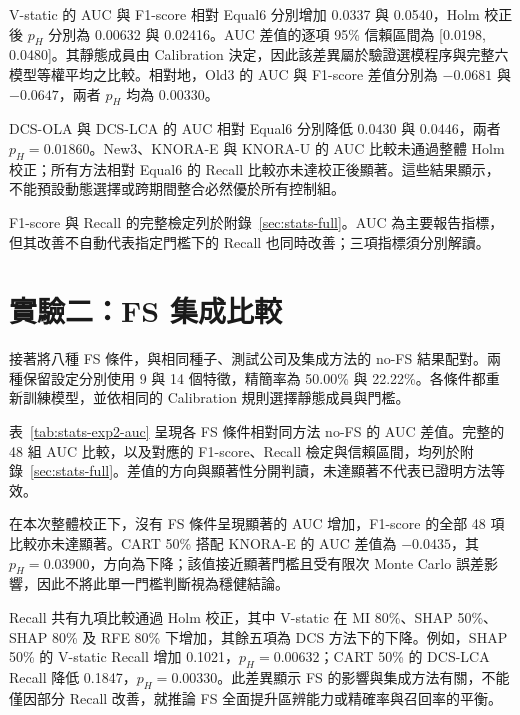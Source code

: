 

V-static 的 AUC 與 F1-score 相對 Equal6 分別增加 0.0337 與 0.0540，Holm 校正後 \(p_H\) 分別為 0.00632 與 0.02416。AUC 差值的逐項 95\% 信賴區間為 [0.0198, 0.0480]。其靜態成員由 Calibration 決定，因此該差異屬於驗證選模程序與完整六模型等權平均之比較。相對地，Old3 的 AUC 與 F1-score 差值分別為 \(-0.0681\) 與 \(-0.0647\)，兩者 \(p_H\) 均為 0.00330。

DCS-OLA 與 DCS-LCA 的 AUC 相對 Equal6 分別降低 0.0430 與 0.0446，兩者 \(p_H=0.01860\)。New3、KNORA-E 與 KNORA-U 的 AUC 比較未通過整體 Holm 校正；所有方法相對 Equal6 的 Recall 比較亦未達校正後顯著。這些結果顯示，不能預設動態選擇或跨期間整合必然優於所有控制組。

F1-score 與 Recall 的完整檢定列於附錄~\ref{sec:stats-full}。AUC 為主要報告指標，但其改善不自動代表指定門檻下的 Recall 也同時改善；三項指標須分別解讀。

\section{實驗二：FS 集成比較}\label{sec:results-experiment2}

接著將八種 FS 條件，與相同種子、測試公司及集成方法的 no-FS 結果配對。兩種保留設定分別使用 9 與 14 個特徵，精簡率為 50.00\% 與 22.22\%。各條件都重新訓練模型，並依相同的 Calibration 規則選擇靜態成員與門檻。



表~\ref{tab:stats-exp2-auc} 呈現各 FS 條件相對同方法 no-FS 的 AUC 差值。完整的 48 組 AUC 比較，以及對應的 F1-score、Recall 檢定與信賴區間，均列於附錄~\ref{sec:stats-full}。差值的方向與顯著性分開判讀，未達顯著不代表已證明方法等效。

在本次整體校正下，沒有 FS 條件呈現顯著的 AUC 增加，F1-score 的全部 48 項比較亦未達顯著。CART 50\% 搭配 KNORA-E 的 AUC 差值為 \(-0.0435\)，其 \(p_H=0.03900\)，方向為下降；該值接近顯著門檻且受有限次 Monte Carlo 誤差影響，因此不將此單一門檻判斷視為穩健結論。

Recall 共有九項比較通過 Holm 校正，其中 V-static 在 MI 80\%、SHAP 50\%、SHAP 80\% 及 RFE 80\% 下增加，其餘五項為 DCS 方法下的下降。例如，SHAP 50\% 的 V-static Recall 增加 0.1021，\(p_H=0.00632\)；CART 50\% 的 DCS-LCA Recall 降低 0.1847，\(p_H=0.00330\)。此差異顯示 FS 的影響與集成方法有關，不能僅因部分 Recall 改善，就推論 FS 全面提升區辨能力或精確率與召回率的平衡。

